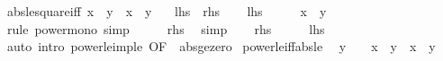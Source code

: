 \begin{isabellebody}
\endisatagproof
{\isafoldproof}%
%
\isadelimproof
\isanewline
%
\endisadelimproof
\isanewline
{}\isamarkupfalse%
\ abs{\isacharunderscore}{\kern0pt}le{\isacharunderscore}{\kern0pt}square{\isacharunderscore}{\kern0pt}iff{\isacharcolon}{\kern0pt}\ {\isachardoublequoteopen}{\isasymbar}x{\isasymbar}\ {\isasymle}\ {\isasymbar}y{\isasymbar}\ {\isasymlongleftrightarrow}\ x\ {\isasymle}\ y\isanewline
\ \ {\isacharparenleft}{\kern0pt}\ {\isachardoublequoteopen}{\isacharquery}{\kern0pt}lhs\ {\isasymlongleftrightarrow}\ {\isacharquery}{\kern0pt}rhs{\isachardoublequoteclose}{\isacharparenright}{\kern0pt}\isanewline
%
\isadelimproof
%
\endisadelimproof
%
\isatagproof
{}\isamarkupfalse%
\isanewline
\ \ \isamarkupfalse%
\ {\isacharquery}{\kern0pt}lhs\isanewline
\ \ \isamarkupfalse%
\ \isamarkupfalse%
\ {\isachardoublequoteopen}{\isasymbar}x{\isasymbar}\ {\isasymle}\ {\isasymbar}y{\isasymbar}\ \isamarkupfalse%
\ {\isacharparenleft}{\kern0pt}rule\ power{\isacharunderscore}{\kern0pt}mono{\isacharparenright}{\kern0pt}\ simp\isanewline
\ \ \isamarkupfalse%
\ \isamarkupfalse%
\ {\isacharquery}{\kern0pt}rhs\ \isamarkupfalse%
\ simp\isanewline
{}\isamarkupfalse%
\isanewline
\ \ \isamarkupfalse%
\ {\isacharquery}{\kern0pt}rhs\isanewline
\ \ \isamarkupfalse%
\ \isamarkupfalse%
\ {\isacharquery}{\kern0pt}lhs\isanewline
\ \ \ \ \isamarkupfalse%
\ {\isacharparenleft}{\kern0pt}auto\ intro{\isacharbang}{\kern0pt}{\isacharcolon}{\kern0pt}\ power{}{\isacharunderscore}{\kern0pt}le{\isacharunderscore}{\kern0pt}imp{\isacharunderscore}{\kern0pt}le\ {\isacharbrackleft}{\kern0pt}OF\ {\isacharunderscore}{\kern0pt}\ abs{\isacharunderscore}{\kern0pt}ge{\isacharunderscore}{\kern0pt}zero{\isacharbrackright}{\kern0pt}{\isacharparenright}{\kern0pt}\isanewline
{}\isamarkupfalse%
%
\endisatagproof
{\isafoldproof}%
%
\isadelimproof
\isanewline
%
\endisadelimproof
\isanewline
{}\isamarkupfalse%
\ power{}{\isacharunderscore}{\kern0pt}le{\isacharunderscore}{\kern0pt}iff{\isacharunderscore}{\kern0pt}abs{\isacharunderscore}{\kern0pt}le{\isacharcolon}{\kern0pt}\isanewline
\ \ {\isachardoublequoteopen}y\ {\isasymge}\ {}\ {\isasymLongrightarrow}\ x\ {\isasymle}\ y\ {\isasymlongleftrightarrow}\ {\isasymbar}x{\isasymbar}\ {\isasymle}\ y{\isachardoublequoteclose}\isanewline

\end{isabellebody}
